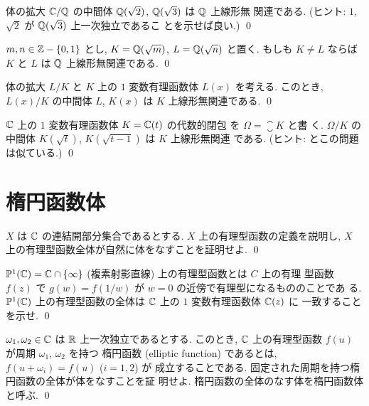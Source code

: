 \documentclass[12pt,twoside]{jarticle}
\begin{document}
\begin{question}\label{q:l-d-sqrt2-sqrt3}
  体の拡大 ${\mathbb C}/{\mathbb Q}$ の中間体 ${\mathbb Q}(\sqrt{2})$, ${\mathbb Q}(\sqrt{3})$ は ${\mathbb Q}$ 上線形無
  関連である.  (ヒント: $1$, $\sqrt{2}$ が ${\mathbb Q}(\sqrt{3})$ 上一次独立であるこ
  とを示せば良い.) \qed
\end{question}

\begin{question}
  $m,n\in{\mathbb Z}-\{0,1\}$ とし, $K={\mathbb Q}(\sqrt{m})$, $L={\mathbb Q}(\sqrt{n})$ と置く.
  もしも $K\ne L$ ならば $K$ と $L$ は ${\mathbb Q}$ 上線形無関連である. \qed
\end{question}

\begin{question}
  体の拡大 $L/K$ と $K$ 上の $1$ 変数有理函数体 $L(x)$ を考える.
  このとき, $L(x)/K$ の中間体 $L$, $K(x)$ は $K$ 上線形無関連である. \qed
\end{question}

\begin{question}
  ${\mathbb C}$ 上の $1$ 変数有理函数体 $K = {\mathbb C}(t)$ の代数的閉包
  を $\Omega=\closure{K}$ と書
  く. $\Omega/K$ の中間体 $K(\sqrt{t})$, $K(\sqrt{t-1})$ は $K$ 上線形無関連
  である.  (ヒント:  とこの問題は似ている.) \qed
\end{question}


\section{楕円函数体}

\begin{question}
  $X$ は ${\mathbb C}$ の連結開部分集合であるとする.
  $X$ 上の有理型函数の定義を説明し,
  $X$ 上の有理型函数全体が自然に体をなすことを証明せよ. \qed
\end{question}

\begin{question}
  ${\mathbb P}^1({\mathbb C})={\mathbb C}\cap\{\infty\}$ (複素射影直線) 上の有理型函数とは $C$ 上の有理
  型函数 $f(z)$ で $g(w)=f(1/w)$ が $w=0$ の近傍で有理型になるもののことであ
  る.  
  ${\mathbb P}^1({\mathbb C})$ 上の有理型函数の全体は ${\mathbb C}$ 上の $1$ 変数有理函数体 ${\mathbb C}(z)$ に
  一致することを示せ.
  \qed
\end{question}

\begin{question}[複素有理函数体]
  $\omega_1,\omega_2\in{\mathbb C}$ は ${\mathbb R}$ 上一次独立であるとする.
  このとき, ${\mathbb C}$ 上の有理型函数 $f(u)$ が周期 $\omega_1$, $\omega_2$ を持つ
  楕円函数 (elliptic function) であるとは, $f(u+\omega_i)=f(u)$ ($i=1,2$) が
  成立することである.  固定された周期を持つ楕円函数の全体が体をなすことを証
  明せよ.  楕円函数の全体のなす体を楕円函数体と呼ぶ. \qed
\end{question}
\end{document}
